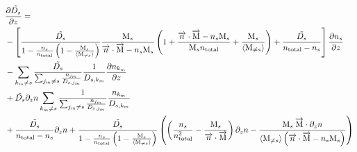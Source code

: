 \begin{landscape}
\begin{equation}
\begin{split}
& \frac{\partial\tilde{D_s}}{\partial z}  = \\
          & - \left[\frac{\tilde{D_s}}{1-\frac{n_s}{n_\text{total}}\left(1 - \frac{\text{M}_s}{\langle\text{M}_{\neq s}\rangle}\right)}
                  \frac{\text{M}_s}{\overrightarrow{n}\cdot\overrightarrow{\text{M}} - n_s\text{M}_s} 
                        \left(1 + \frac{\overrightarrow{n}\cdot\overrightarrow{\text{M}} - n_s\text{M}_s}{\text{M}_sn_\text{total}} + \frac{\text{M}_s}{\langle\text{M}_{\neq s}\rangle}\right)
                  + \frac{\tilde{D_s}}{n_\text{total} - n_s}\right]
                \frac{\partial n_s}{\partial z} \\
          & - \sum_{k_m\neq s}\frac{\tilde{D_s}}{\sum_{j_m \neq s}\frac{n_{j_m}}{D_{s,j_m}}}
                                \frac{1}{D_{s,k_m}} \frac{\partial n_{k_m}}{\partial z} \\
          & +  \tilde{D_s}\partial_{z}{n} \sum_{k_m\neq s}
                           \frac{1}{\sum_{j_m \neq s}\frac{n_{j_m}}{D_{s,j_m}}}
                                        \frac{n_{k_m}}{D_{s,k_m}} \\
          & + \frac{\tilde{D_s}}{n_\text{total} - n_s}\partial_{z}{n} 
            + \frac{\tilde{D_s}}{1-\frac{n_s}{n_\text{total}}\left(1 - \frac{\text{M}_s}{\langle\text{M}_{\neq s}\rangle}\right)}
              \left(\left(\frac{n_s}{n_\text{total}^2} - \frac{\text{M}_s}{\overrightarrow{n}\cdot\overrightarrow{\text{M}}}\right)\partial_{z}{n}
                        - \frac{\text{M}_s\:\overrightarrow{\text{M}}\cdot\partial_{z}{n}}
                               {\langle\text{M}_{\neq s}\rangle\left(\overrightarrow{n}\cdot\overrightarrow{\text{M}} - n_s\text{M}_s\right)}
                    \right)\\
\end{split}
\label{Titan:diff_deriv_D_tilde}
\end{equation}
\end{landscape}

